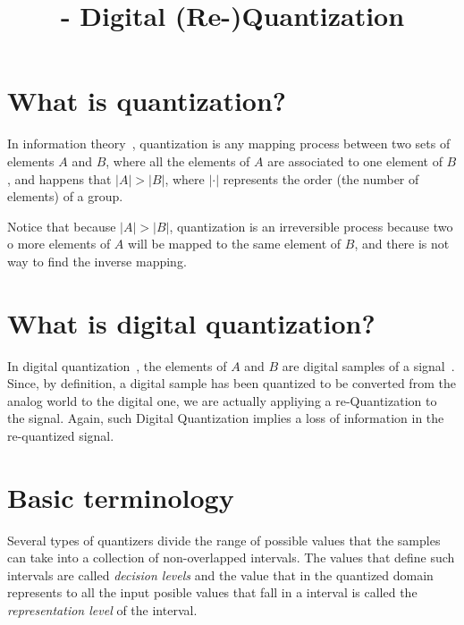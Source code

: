 


\title{\SM{} - Digital (Re-)Quantization}

\maketitle

\tableofcontents

\section{What is quantization?}

In information theory~\cite{vruiz__information_theory}, quantization
is any mapping process between two sets of elements $A$ and $B$, where
all the elements of $A$ are associated to one element of $B$, and
happens that $|A|>|B|$, where $|\cdot|$ represents the order (the
number of elements) of a group.

Notice that because $|A|>|B|$, quantization is an irreversible process
because two o more elements of $A$ will be mapped to the same element
of $B$, and there is not way to find the inverse mapping.

\section{What is digital quantization?}

In digital
quantization~\cite{vruiz__scalar_quantization,vruiz__vector_quantization},
the elements of $A$ and $B$ are digital samples of a
signal~\cite{vruiz__signal_quantization}. Since, by definition, a
digital sample has been quantized to be converted from the analog
world to the digital one, we are actually appliying a re-Quantization
to the signal. Again, such Digital Quantization implies a loss of
information in the re-quantized signal.

\section{Basic terminology}

Several types of quantizers divide the range of possible values that
the samples can take into a collection of non-overlapped
intervals. The values that define such intervals are called \emph{decision
levels} and the value that in the quantized domain represents to all
the input posible values that fall in a interval is called the
\emph{representation level} of the interval.

